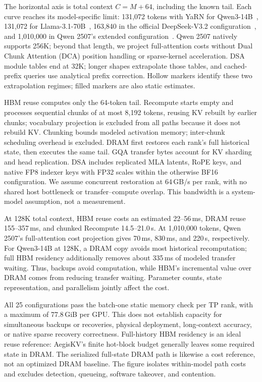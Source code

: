 The horizontal axis is total context $C=M+64$, including the known tail.
Each curve reaches its model-specific limit: 131,072 tokens with YaRN
for Qwen3-14B~\cite{qwen2025technical}, 131,072 for
Llama-3.1-70B~\cite{meta2024llama31card}, 163,840 in the official
DeepSeek-V3.2 configuration~\cite{deepseek2025v32config}, and 1,010,000
in Qwen 2507's extended configuration~\cite{qwen2025instruct2507}.
Qwen 2507 natively supports 256K; beyond that length, we project
full-attention costs without Dual Chunk Attention (DCA) position handling
or sparse-kernel acceleration. DSA module tables end at 32K; longer
shapes extrapolate those tables, and cached-prefix queries use analytical
prefix correction. Hollow markers identify these two extrapolation
regimes; filled markers are also static estimates.

HBM reuse computes only the 64-token tail. Recompute starts empty and
processes sequential chunks of at most 8,192 tokens, reusing KV rebuilt
by earlier chunks; vocabulary projection is excluded
from all paths because it does not rebuild KV. Chunking bounds modeled
activation memory; inter-chunk scheduling overhead is excluded.
DRAM first restores each rank's full historical
state, then executes the same tail. GQA transfer bytes account for KV
sharding and head replication. DSA includes replicated MLA latents,
RoPE keys, and native FP8 indexer keys with FP32 scales within the
otherwise BF16 configuration. We assume concurrent restoration at
64\,GB/s per rank, with no shared host bottleneck or transfer--compute
overlap. This bandwidth is a system-model assumption, not a measurement.

At 128K total context, HBM reuse costs an estimated 22--56\,ms,
DRAM reuse 155--357\,ms, and chunked Recompute 14.5--21.0\,s.
At 1,010,000 tokens, Qwen 2507's full-attention cost projection gives
70\,ms, 830\,ms, and 220\,s, respectively. For Qwen3-14B at 128K,
a DRAM copy avoids most historical recomputation; full HBM residency
additionally removes about 335\,ms of modeled transfer waiting.
Thus, backups avoid computation, while HBM's incremental value over
DRAM comes from reducing transfer waiting. Parameter counts, state
representation, and parallelism jointly affect the cost.

All 25 configurations pass the batch-one static memory check per TP
rank, with a maximum of 77.8\,GiB per GPU. This does not establish capacity
for simultaneous backups or recoveries, physical deployment, long-context
accuracy, or native sparse recovery correctness.
Full-history HBM residency is an ideal reuse reference: AegisKV's finite
hot-block budget generally leaves some required state in DRAM.
The serialized full-state DRAM path is likewise a cost reference, not
an optimized DRAM baseline. The figure isolates within-model path costs
and excludes detection, queueing, software takeover, and contention.


